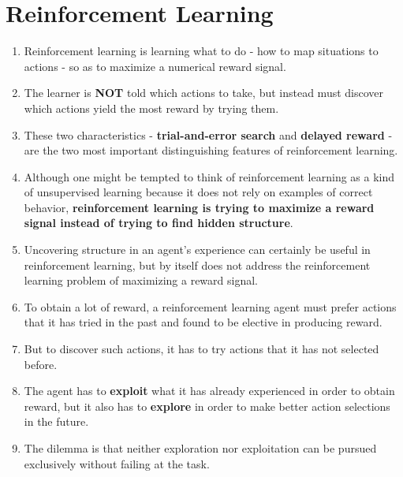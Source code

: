 \section{Reinforcement Learning \cite{drl-1,dnn-1}} \label{Reinforcement Learning}

\begin{enumerate}
    \item Reinforcement learning is learning what to do - how to map situations to actions - so as to maximize a numerical reward signal.

    \item The learner is \textbf{NOT} told which actions to take, but instead must discover which actions yield the most reward by trying them.

    \item These two characteristics - \textbf{trial-and-error search} and \textbf{delayed reward} - are the two most important distinguishing features of reinforcement learning.

    \item  Although one might be tempted to think of reinforcement learning as a kind of unsupervised learning because it does not rely on examples of correct behavior, \textbf{reinforcement learning is trying to maximize a reward signal instead of trying to find hidden structure}. 
    
    \item Uncovering structure in an agent’s experience can certainly be useful in reinforcement learning, but by itself does not address the reinforcement learning problem of maximizing a reward signal.

    \item  To obtain a lot of reward, a reinforcement learning agent must prefer actions that it has tried in the past and found to be elective in producing reward. 
    
    \item But to discover such actions, it has to try actions that it has not selected before. 
    
    \item The agent has to \textbf{exploit} what it has already experienced in order to obtain reward, but it also has to \textbf{explore} in order to make better action selections in the future. 
    
    \item The dilemma is that neither exploration nor exploitation can be pursued exclusively without failing at the task. 
    

\end{enumerate}
